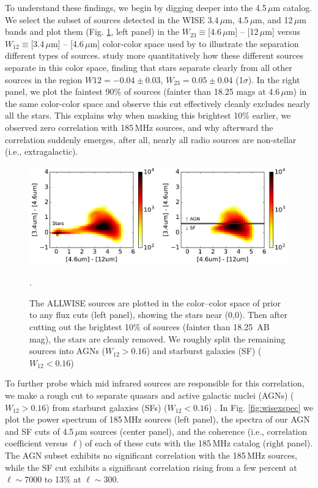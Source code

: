 \documentclass{emulateapj}
\begin{document}
To understand these findings, we begin by digging deeper into the 4.5\,$\mu$m catalog. We select the subset of sources detected in the WISE 3.4\,$\mu$m, 4.5\,$\mu$m, and 12\,$\mu$m bands and plot them (Fig. \ref{fig:wisecolorcolor}, left panel) in the $W_{23}\equiv$[4.6\,$\mu$m] -- [12\,$\mu$m] versus $W_{12}\equiv$[3.4\,$\mu$m] -- [4.6\,$\mu$m] color-color space used by \citet{Wright2010} to illustrate the separation different types of sources. \citet{nikutta14} study more quantitatively how these different sources separate in this color space, finding that stars separate clearly from all other sources in the region $W{12}=-0.04\pm0.03$, $W_{23}=0.05\pm0.04$ (1$\sigma$). In the right panel, we plot the faintest 90\% of sources (fainter than 18.25 mags at 4.6\,$\mu$m) in the same color-color space and observe this cut effectively cleanly excludes nearly all the stars. This explains why when masking this brightest 10\% earlier, we observed zero correlation with 185\,MHz sources, and why afterward the correlation suddenly emerges, after all, nearly all radio sources are non-stellar (i.e., extragalactic). 

\begin{figure}[h]
\centering
\includegraphics[width=6in]{images/wise_color_color_figure_max=1e-3_5Jy.pdf}
\caption{The ALLWISE sources are plotted in the color--color space of \citet{Wright2010} prior to any flux cuts (left panel), showing the stars near (0,0). Then after cutting out the brightest 10\% of sources (fainter than 18.25\, AB mag), the stars are cleanly removed. We roughly split the remaining sources into AGNs ($W_{12}>0.16$) and starburst galaxies (SF) ($W_{12}<0.16$) \citep{nikutta14,kurcz16}}.
\label{fig:wisecolorcolor}
\end{figure}

To further probe which mid infrared sources are responsible for this correlation, we make a rough cut to separate quasars and active galactic nuclei (AGNs) ($W_{12}>0.16$) from starburst galaxies (SFs) ($W_{12}<0.16$) \citep{nikutta14,kurcz16}. In Fig. \ref{fig:wisexspec} we plot the power spectrum of 185\,MHz sources (left panel), the spectra of our AGN and SF cuts of 4.5\,$\mu$m sources (center panel), and the coherence (i.e., correlation coefficient versus $\ell$) of each of these cuts with the 185\,MHz catalog (right panel). The AGN subset exhibits no significant correlation with the 185\,MHz sources, while the SF cut exhibits a significant correlation rising from a few percent at $\ell\sim7000$ to 13\% at $\ell\sim300$. 
\end{document}
